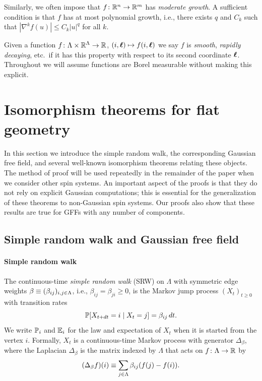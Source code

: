\documentclass[11pt,a4paper]{article}
\begin{document}
Similarly, we often impose that $f\colon \R^{n}\to\R^{m}$ has
\emph{moderate growth}. A sufficient condition is that $f$ has at most
polynomial growth, i.e., there exists $q$ and $C_{k}$ such that
$|\nabla^kf(u)|\leq C_{k}|u|^q$ for all $k$.

Given a function $f\colon\Lambda\times\R^{\Lambda}\to \R$,
$(i,\V{\ell})\mapsto f(i,\V{\ell})$ we say $f$ is \emph{smooth},
\emph{rapidly decaying}, etc.\ if it has this property with respect to its
second coordinate $\V{\ell}$. Throughout we will assume
functions are Borel measurable without making this explicit.


\section{Isomorphism theorems for flat geometry}
\label{sec:euclidean}

In this section we introduce the simple random walk, the corresponding
Gaussian free field, and several well-known isomorphism theorems
relating these objects. The method of proof will be used repeatedly in
the remainder of the paper when we consider other spin systems.  An
important aspect of the proofs is that they do not rely on explicit
Gaussian computations; this is essential for the generalization of
these theorems to non-Gaussian spin systems. Our proofs also show that
these results are true for GFFs with any number of components.

\subsection{Simple random walk and Gaussian free field}
\label{sec:basic-definitions}

\paragraph{Simple random walk}
\label{sec:SRW}

The continuous-time \emph{simple random walk} (SRW) on $\Lambda$
with symmetric edge weights $\beta \bydef (\beta_{ij})_{i,j\in\Lambda}$,
i.e., $\beta_{ij}=\beta_{ji} \geq 0$, is the
Markov jump process $(X_{t})_{t\geq 0}$ with transition rates
\begin{equation}
  \label{eq:SRW-J}
  \P\cb{X_{t+dt}=i\mid X_{t}=j} = \beta_{ij}\,dt.
\end{equation}
We write $\P_{i}$ and $\E_{i}$ for the law and expectation of $X_t$ when
it is started from the vertex $i$.  Formally, $X_{t}$ is a
continuous-time Markov process with generator $\Delta_{\beta}$, where
the Laplacian $\Delta_{\beta}$ is the matrix indexed by
$\Lambda$ that acts on $f \colon \Lambda \to \R$ by
\begin{equation}
  \label{eq:Lact}
  (\Delta_{\beta}f)(i)
  \bydef
  \sum_{j\in\Lambda}\beta_{ij}(f(j)-f(i)).
\end{equation}
\end{document}
